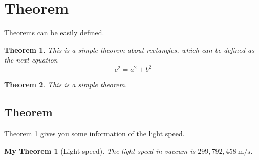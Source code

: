 \documentclass[12pt]{article}
\begin{document}
\section{Theorem}
Theorems can be easily defined.
\newtheorem{theorem}{Theorem}[section]
\begin{theorem}
This is a simple theorem about rectangles, which can be defined as the next equation $$c^2=a^2+b^2$$
\end{theorem}
\begin{theorem}
This is a simple theorem.
\end{theorem}

\subsection{Theorem}
Theorem \ref{thm:light} gives you some information of the light speed.
\newtheorem{mythm}{My Theorem}[subsection]
\begin{mythm}[Light speed]\label{thm:light}
The light speed in vaccum is $299,792,458\ \mathrm{m/s}$.
\end{mythm}
\end{document}
